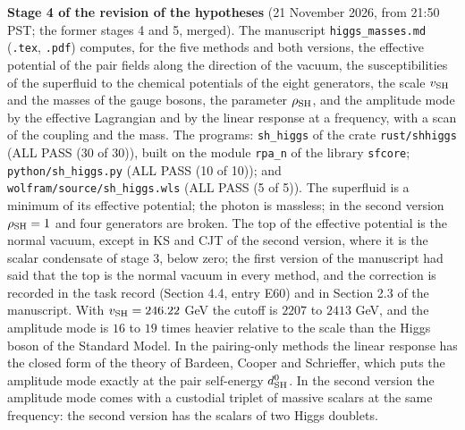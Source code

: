 \documentclass[
  10pt,
]{article}
\begin{document}
\textbf{Stage 4 of the revision of the hypotheses} (21 November 2026,
from 21:50 PST; the former stages 4 and 5, merged). The manuscript
\texttt{higgs\_masses.md} (\texttt{.tex}, \texttt{.pdf}) computes, for
the five methods and both versions, the effective potential of the pair
fields along the direction of the vacuum, the susceptibilities of the
superfluid to the chemical potentials of the eight generators, the scale
\(v_{\rm SH}\) and the masses of the gauge bosons, the parameter
\(\rho_{\rm SH}\), and the amplitude mode by the effective Lagrangian
and by the linear response at a frequency, with a scan of the coupling
and the mass. The programs: \texttt{sh\_higgs} of the crate
\texttt{rust/shhiggs} (ALL PASS (30 of 30)), built on the module
\texttt{rpa\_n} of the library \texttt{sfcore};
\texttt{python/sh\_higgs.py} (ALL PASS (10 of 10)); and
\texttt{wolfram/source/sh\_higgs.wls} (ALL PASS (5 of 5)). The
superfluid is a minimum of its effective potential; the photon is
massless; in the second version \(\rho_{\rm SH}=1\) and four generators
are broken. The top of the effective potential is the normal vacuum,
except in KS and CJT of the second version, where it is the scalar
condensate of stage 3, below zero; the first version of the manuscript
had said that the top is the normal vacuum in every method, and the
correction is recorded in the task record (Section 4.4, entry E60) and
in Section 2.3 of the manuscript. With \(v_{\rm SH}=246.22\) GeV the
cutoff is \(2207\) to \(2413\) GeV, and the amplitude mode is \(16\) to
\(19\) times heavier relative to the scale than the Higgs boson of the
Standard Model. In the pairing-only methods the linear response has the
closed form of the theory of Bardeen, Cooper and Schrieffer, which puts
the amplitude mode exactly at the pair self-energy \(d^0_{\rm SH}\). In
the second version the amplitude mode comes with a custodial triplet of
massive scalars at the same frequency: the second version has the
scalars of two Higgs doublets.
\end{document}
